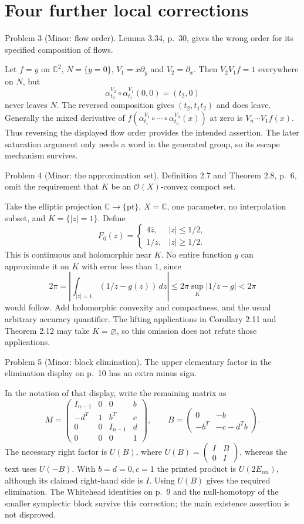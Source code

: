 \documentclass[10pt]{article}
\begin{document}
\section*{Four further local corrections}
Problem 3 (Minor: flow order).  Lemma 3.34, p. 30, gives the wrong order for its specified composition of flows.\par
Let \(f=y\) on \(\mathbb C^2\), \(N=\{y=0\}\), \(V_1=x\partial_y\) and \(V_2=\partial_x\). Then \(V_2V_1f=1\) everywhere on \(N\), but \[\alpha^{V_2}_{t_2}\circ\alpha^{V_1}_{t_1}(0,0)=(t_2,0)\] never leaves \(N\). The reversed composition gives \((t_2,t_1t_2)\) and does leave. Generally the mixed derivative of \(f(\alpha^{V_1}_{t_1}\circ\cdots\circ\alpha^{V_n}_{t_n}(x))\) at zero is \(V_n\cdots V_1f(x)\). Thus reversing the displayed flow order provides the intended assertion. The later saturation argument only needs a word in the generated group, so its escape mechanism survives.\par
Problem 4 (Minor: the approximation set).  Definition 2.7 and Theorem 2.8, p. 6, omit the requirement that \(K\) be an \(\mathcal O(X)\)-convex compact set.\par
Take the elliptic projection \(\mathbb C\to\{\mathrm{pt}\}\), \(X=\mathbb C\), one parameter, no interpolation subset, and \(K=\{|z|=1\}\). Define \[F_0(z)=
 \begin{cases}4\bar z,&|z|\le1/2,\\1/z,&|z|\ge1/2.\end{cases}\] This is continuous and holomorphic near \(K\). No entire function \(g\) can approximate it on \(K\) with error less than \(1\), since \[2\pi=\left|\int_{|z|=1}(1/z-g(z))\,dz\right|
 \le2\pi\sup_K|1/z-g|<2\pi\] would follow. Add holomorphic convexity and compactness, and the usual arbitrary accuracy quantifier. The lifting applications in Corollary 2.11 and Theorem 2.12 may take \(K=\varnothing\), so this omission does not refute those applications.\par
Problem 5 (Minor: block elimination).  The upper elementary factor in the elimination display on p. 10 has an extra minus sign.\par
In the notation of that display, write the remaining matrix as \[M=\begin{pmatrix}
 I_{n-1}&0&0&b\\
 -d^T&1&b^T&c\\
 0&0&I_{n-1}&d\\
 0&0&0&1
 \end{pmatrix},\qquad
 B=\begin{pmatrix}0&-b\\-b^T&-c-d^Tb\end{pmatrix}.\] The necessary right factor is \(U(B)\), where \(U(B)=\left(\begin{smallmatrix}I&B\\0&I\end{smallmatrix}\right)\), whereas the text uses \(U(-B)\). With \(b=d=0,c=1\) the printed product is \(U(2E_{nn})\), although its claimed right-hand side is \(I\). Using \(U(B)\) gives the required elimination. The Whitehead identities on p. 9 and the null-homotopy of the smaller symplectic block survive this correction; the main existence assertion is not disproved.\par
\end{document}
